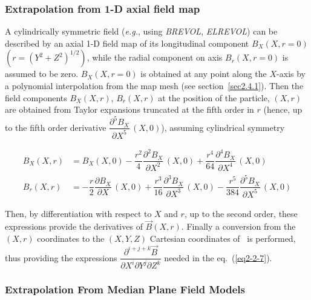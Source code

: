 \subsubsection[Extrapolation from  1-D axial field map]
      {Extrapolation from  1-D axial field map~\protect\cite{Biblio3}}
       \label{sec2.3.1} %


 A cylindrically symmetric field (\emph{e.g.}, using \textsl{BREVOL}, \textsl{ELREVOL}) can be described
by an axial 1-D field map of its longitudinal component $ B_X(X,r=0) $
 $(r=(Y^2+Z^2)^{1/2})$,  
while the radial component on axis $ B_r(X,r=0) $ is assumed to be zero. $ B_X(X,r=0) $ is obtained 
at any point along the $ X$-axis by a 
polynomial interpolation from the map mesh (see section~\ref{sec2.4.1}).  %
Then the field components $ B_X(X,r)$,  $ B_r(X,r) $ at the position of the particle, 
$(X,r) $ are obtained from Taylor expansions truncated at  the fifth order in $ r $ (hence, up to 
the fifth order derivative $ \dfrac{ \partial^ 5B_X }{ \partial X^5} \,(X,0)$),  
assuming cylindrical symmetry 

 \begin{equation}
	 \begin{aligned}
		 B_X(X,r) 
		   &   =  B_X(X,0) -
		       \dfrac{r^2 }{ 4} \dfrac{\partial^ 2B_X }{ \partial X^2}\, (X,0)
		       + \dfrac{r^4 }{64} \dfrac{\partial^ 4B_X }{ \partial X^4} \,(X,0) \\
		 B_r(X,r)
		   & =    - \dfrac{r }{ 2} \dfrac{\partial B_X }{ \partial X} \, (X,0) 
		       + \dfrac{r^3 }{ 16} \dfrac{\partial^ 3B_X }{ \partial X^3}\, (X,0)
		       - \dfrac{r^5 }{384} \dfrac{\partial^ 5B_X }{ \partial X^5}\, (X,0) 
	 \end{aligned}
 	\label{eq2-3-1}
 \end{equation}

\noindent Then, by differentiation with respect to $ X $ and $ r$,  up to the second
order, these expressions provide the derivatives of $ \vec  B(X,r)$.  Finally a conversion
from the $ (X,r) $ coordinates to the $ (X,Y,Z) $ Cartesian coordinates of \zgou\ is 
performed, thus providing the expressions 
$ \dfrac{ \partial^{i+j+k} \vec  B }{\partial X^i\partial Y^j\partial Z^k} $ needed in the 
eq.~(\ref{eq2-2-7}). 





\subsubsection{Extrapolation From  Median Plane Field Models} \label{sec2.3.2} %

